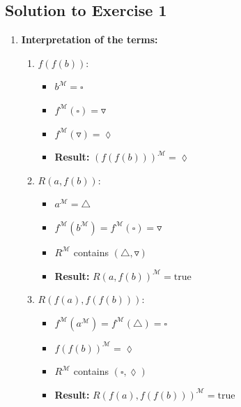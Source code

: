 \documentclass[11pt]{article}
\begin{document}
    \subsection{Solution to Exercise 1}\label{subsec:solution-to-exercise-1}

    \begin{enumerate}
        \item \textbf{Interpretation of the terms:}
        \begin{enumerate}
            \item $f(f(b))$:
            \begin{itemize}
                \item $b^\mathcal{M} = \square$
                \item $f^\mathcal{M}(\square) = \triangledown$
                \item $f^\mathcal{M}(\triangledown) = \lozenge$
                \item \textbf{Result:} $(f(f(b)))^\mathcal{M} = \lozenge$
            \end{itemize}
            \item $R(a, f(b))$:
            \begin{itemize}
                \item $a^\mathcal{M} = \triangle$
                \item $f^\mathcal{M}(b^\mathcal{M}) = f^\mathcal{M}(\square) = \triangledown$
                \item $R^\mathcal{M}$ contains $(\triangle, \triangledown)$
                \item \textbf{Result:} $R(a, f(b))^\mathcal{M} = \text{true}$
            \end{itemize}
            \item $R(f(a), f(f(b)))$:
            \begin{itemize}
                \item $f^\mathcal{M}(a^\mathcal{M}) = f^\mathcal{M}(\triangle) = \square$
                \item $f(f(b))^\mathcal{M} = \lozenge$
                \item $R^\mathcal{M}$ contains $(\square, \lozenge)$
                \item \textbf{Result:} $R(f(a), f(f(b)))^\mathcal{M} = \text{true}$
            \end{itemize}
        \end{enumerate}


\end{enumerate}
\end{document}
